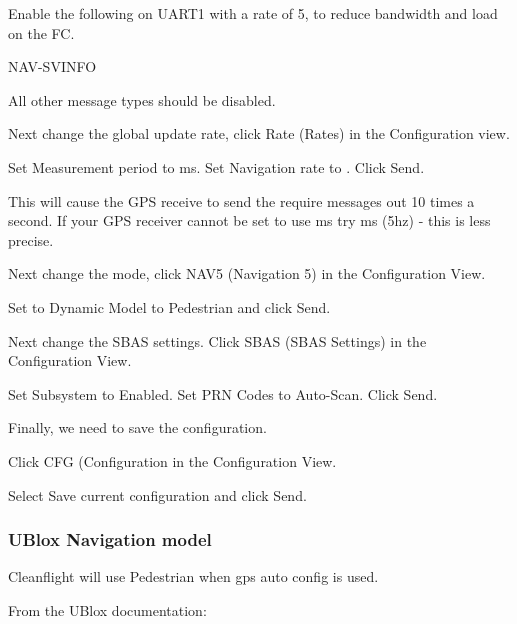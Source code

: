 Enable the following on U\+A\+R\+T1 with a rate of 5, to reduce bandwidth and load on the F\+C. \begin{DoxyVerb}NAV-SVINFO
\end{DoxyVerb}


All other message types should be disabled.

Next change the global update rate, click {\ttfamily Rate (Rates)} in the Configuration view.

Set {\ttfamily Measurement period} to {} ms. Set {\ttfamily Navigation rate} to {}. Click {\ttfamily Send}.

This will cause the G\+P\+S receive to send the require messages out 10 times a second. If your G\+P\+S receiver cannot be set to use {}ms try {}ms (5hz) -\/ this is less precise.

Next change the mode, click {\ttfamily N\+A\+V5 (Navigation 5)} in the Configuration View.

Set to {\ttfamily Dynamic Model} to {\ttfamily Pedestrian} and click {\ttfamily Send}.

Next change the S\+B\+A\+S settings. Click {\ttfamily S\+B\+A\+S (S\+B\+A\+S Settings)} in the Configuration View.

Set {\ttfamily Subsystem} to {\ttfamily Enabled}. Set {\ttfamily P\+R\+N Codes} to {\ttfamily Auto-\/\+Scan}. Click {\ttfamily Send}.

Finally, we need to save the configuration.

Click {\ttfamily C\+F\+G (Configuration} in the Configuration View.

Select {\ttfamily Save current configuration} and click {\ttfamily Send}.

\subsubsection*{U\+Blox Navigation model}

Cleanflight will use {\ttfamily Pedestrian} when gps auto config is used.

From the U\+Blox documentation\+:


